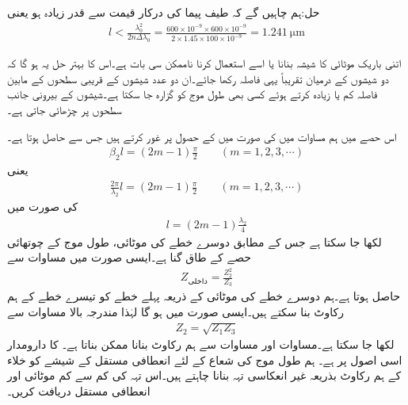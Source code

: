 حل:ہم چاہیں گے کہ طیف پیما کی  درکار قیمت سے قدر زیادہ ہو یعنی
\begin{align*}
l< \frac{\lambda_0^2}{2n\Delta \lambda_0}=\frac{600\times 10^{-9} \times 600 \times 10^{-9}}{2\times 1.45\times 100 \times 10^{-9}}=\SI{1.241}{\micro\meter}
\end{align*}

اتنی باریک موٹائی کا شیشہ بنانا یا اسے استعمال کرنا ناممکن سی بات ہے۔اس کا بہتر حل یہ ہو گا کہ دو شیشوں کے درمیان تقریباً یہی فاصلہ رکھا جائے۔ان دو عدد شیشوں کے قریبی سطحوں کے مابین فاصلہ کم یا زیادہ کرتے ہوئے کسی بھی طول موج کو گزارہ جا سکتا ہے۔شیشوں کے بیرونی جانب سطحوں پر  چڑھائی جاتی ہے۔

اس حصے میں ہم مساوات  میں  کی صورت میں  کے  حصول پر غور کرتے ہیں جس سے  حاصل ہوتا ہے۔
\begin{align*}
\beta_2 l =(2m-1)\frac{\pi}{2} \quad \quad (m=1,2,3,\cdots)
\end{align*}
یعنی
\begin{align*}
\frac{2\pi}{\lambda_2} l =(2m-1)\frac{\pi}{2} \quad \quad (m=1,2,3,\cdots)
\end{align*}
کی صورت میں 
\begin{align}\label{مساوات_مستوی_بے_انعکاس_الف}
l=(2m-1)\frac{\lambda_2}{4}
\end{align}
لکھا جا سکتا ہے جس کے مطابق دوسرے خطے کی موٹائی، طول موج کے چوتھائی حصے کے طاق گنا ہے۔ایسی صورت میں  مساوات  سے
\begin{align}
Z_{\text{داخلی}}=\frac{Z_2^2}{Z_3}
\end{align}
حاصل ہوتا ہے۔ہم دوسرے خطے کی موٹائی کے ذریعہ پہلے خطے کو تیسرے خطے کے ہم رکاوٹ بنا سکتے ہیں۔ایسی صورت میں  ہو گا لہٰذا مندرجہ بالا مساوات سے
\begin{align}\label{مساوات_مستوی_بے_انعکاس_ب}
Z_2=\sqrt{Z_1 Z_3}
\end{align}
لکھا جا سکتا ہے۔مساوات  اور مساوات   سے ہم رکاوٹ بنانا ممکن بناتا ہے۔  کا دارومدار اسی اصول پر ہے۔
ہم  طول موج کی شعاع کے لئے  انعطافی مستقل کے شیشے کو خلاء  کے ہم رکاوٹ بذریعہ غیر انعکاسی تہہ بنانا چاہتے ہیں۔اس تہہ کی کم سے کم موٹائی اور انعطافی مستقل  دریافت کریں۔  

